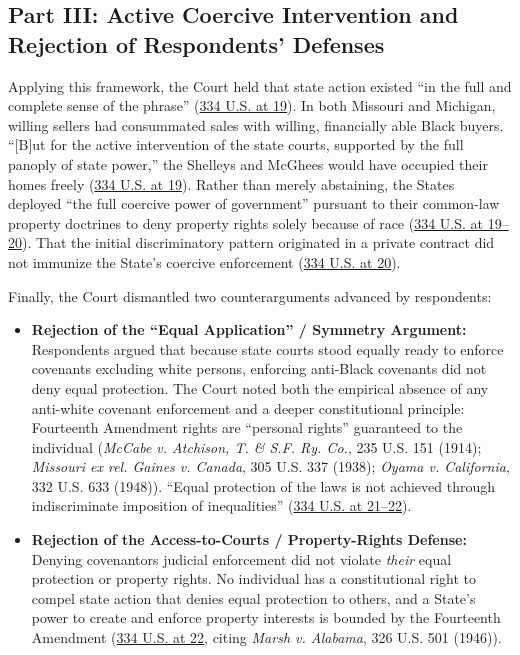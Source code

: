 \documentclass[12pt]{article}
\begin{document}
\subsection{Part III: Active Coercive Intervention and Rejection of Respondents' Defenses}
Applying this framework, the Court held that state action existed ``in the full and complete sense of the phrase'' (\href{https://supreme.justia.com/cases/federal/us/334/1/}{334 U.S. at 19}). In both Missouri and Michigan, willing sellers had consummated sales with willing, financially able Black buyers. ``[B]ut for the active intervention of the state courts, supported by the full panoply of state power,'' the Shelleys and McGhees would have occupied their homes freely (\href{https://supreme.justia.com/cases/federal/us/334/1/}{334 U.S. at 19}). Rather than merely abstaining, the States deployed ``the full coercive power of government'' pursuant to their common-law property doctrines to deny property rights solely because of race (\href{https://supreme.justia.com/cases/federal/us/334/1/}{334 U.S. at 19--20}). That the initial discriminatory pattern originated in a private contract did not immunize the State's coercive enforcement (\href{https://supreme.justia.com/cases/federal/us/334/1/}{334 U.S. at 20}).

Finally, the Court dismantled two counterarguments advanced by respondents:
\begin{itemize}
    \item \textbf{Rejection of the ``Equal Application'' / Symmetry Argument:} Respondents argued that because state courts stood equally ready to enforce covenants excluding white persons, enforcing anti-Black covenants did not deny equal protection. The Court noted both the empirical absence of any anti-white covenant enforcement and a deeper constitutional principle: Fourteenth Amendment rights are ``personal rights'' guaranteed to the individual (\textit{McCabe v. Atchison, T. \& S.F. Ry. Co.}, 235 U.S. 151 (1914); \textit{Missouri ex rel. Gaines v. Canada}, 305 U.S. 337 (1938); \textit{Oyama v. California}, 332 U.S. 633 (1948)). ``Equal protection of the laws is not achieved through indiscriminate imposition of inequalities'' (\href{https://supreme.justia.com/cases/federal/us/334/1/}{334 U.S. at 21--22}).
    \item \textbf{Rejection of the Access-to-Courts / Property-Rights Defense:} Denying covenantors judicial enforcement did not violate \textit{their} equal protection or property rights. No individual has a constitutional right to compel state action that denies equal protection to others, and a State's power to create and enforce property interests is bounded by the Fourteenth Amendment (\href{https://supreme.justia.com/cases/federal/us/334/1/}{334 U.S. at 22}, citing \textit{Marsh v. Alabama}, 326 U.S. 501 (1946)).
\end{itemize}
\end{document}
